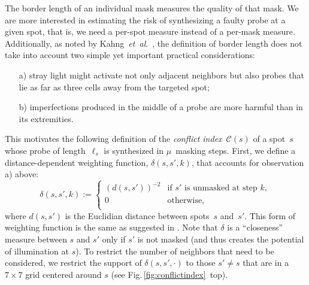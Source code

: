 \documentclass[runningheads]{llncs}
\begin{document}
The border length of an individual mask measures the quality of that
mask. We are more interested in estimating the risk of synthesizing a faulty
probe at a given spot, that is, we need a per-spot measure
instead of a per-mask measure. Additionally, as noted by Kahng~{\it et~al}.~\cite{KAHNG03A},
the definition of border length does not take into account two
simple yet important practical considerations:
\begin{itemize}
\item[a)] stray light might activate not only adjacent neighbors but
  also probes that lie as far as three cells away from the targeted
  spot;
\item[b)] imperfections produced in the middle of a probe are more
  harmful than in its extremities.
\end{itemize}
This motivates the following definition of the \emph{conflict
  index}~$\mathcal{C}(s)$ of a spot~$s$ whose probe of
length~$\ell_{s}$ is synthesized in $\mu$~masking steps. First, we
define a distance-dependent weighting function, $\delta(s,s',k)$, that
accounts for observation a) above:
\begin{equation}
\label{eq:dist_weight}
\delta(s,s',k) :=
        \left\{
                \begin{array}{ll}
                        (d(s,s'))^{-2} & \mbox{if $s'$ is unmasked at step $k$}, \\
                        0 & \mbox{otherwise}, \\
                \end{array}
        \right.
\end{equation}
where $d(s,s')$ is the Euclidian distance between spots~$s$ and~$s'$.
This form of weighting function is the same as suggested in
\cite{KAHNG03A}.  Note that $\delta$ is a ``closeness'' measure
between $s$ and $s'$ only if $s'$ is
not masked (and thus creates the potential of illumination at $s$). To
restrict the number of neighbors that need to be considered, we
restrict the support of $\delta(s,s',\cdot)$ to those $s'\neq s$ that
are in a $7\times 7$ grid centered around $s$ (see
Fig.\,\ref{fig:conflictindex}~top).
\end{document}
